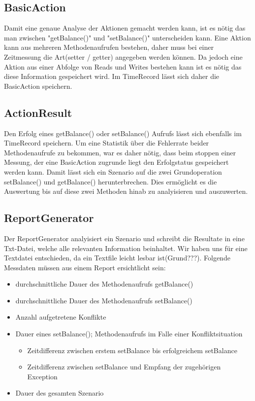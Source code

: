 \subsection{BasicAction}
\label{sec:BasicAction}
Damit eine genaue Analyse der Aktionen gemacht werden kann, ist es nötig das man zwischen "getBalance()" und "setBalance()" unterscheiden kann. Eine Aktion kann aus mehreren Methodenaufrufen bestehen, daher muss bei einer Zeitmessung die Art(setter / getter) angegeben werden können. Da jedoch eine Aktion aus einer Abfolge von Reads und Writes bestehen kann ist es nötig das diese Information gespeichert wird. Im TimeRecord lässt sich daher die BasicAction speichern.

\subsection{ActionResult}
\label{sec:ActionResult}
Den Erfolg eines getBalance() oder setBalance() Aufrufs lässt sich ebenfalls im TimeRecord speichern. Um eine Statistik über die Fehlerrate beider Methodenaufrufe zu bekommen, war es daher nötig, dass beim stoppen einer Messung, der eine BasicAction zugrunde liegt den Erfolgstatus gespeichert werden kann. Damit lässt sich ein Szenario auf die zwei Grundoperation setBalance() und getBalance() herunterbrechen. Dies ermöglicht es die Auswertung bis auf diese zwei Methoden hinab zu analyisieren und auszuwerten.

\subsection{ReportGenerator}
\label{sec:reportGenerator}
Der ReportGenerator analyisiert ein Szenario und schreibt die Resultate in eine Txt-Datei, welche alle relevanten Information beinhaltet. Wir haben uns für eine Textdatei entschieden, da ein Textfile leicht lesbar ist(Grund???). Folgende Messdaten müssen aus einem Report ersichtlicht sein:
\begin{itemize}
\item durchschnittliche Dauer des Methodenaufrufs getBalance()
\item durchschnittliche Dauer des Methodenaufrufs setBalance()
\item Anzahl aufgetretene Konflikte
\item Dauer eines setBalance(); Methodenaufrufs im Falle einer Konfliktsituation
  \begin{itemize}
  \item Zeitdifferenz zwischen erstem setBalance bis erfolgreichem setBalance
  \item Zeitdifferenz zwischen setBalance und Empfang der zugehörigen Exception
  \end{itemize}
\item Dauer des gesamten Szenario
\end{itemize}

